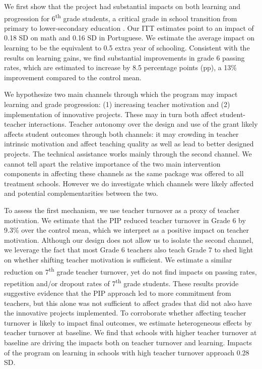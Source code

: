 \documentclass[11pt,a4paper]{article}
\begin{document}

We first show that the project had substantial impacts on both learning and progression for 6\textsuperscript{th} grade students, a critical grade in school transition from primary to lower-secondary education \citep{dos2017mais}. Our ITT estimates point to an impact of 0.18 SD on math and 0.16 SD in Portuguese. We estimate the average impact on learning to be the equivalent to 0.5 extra year of schooling. Consistent with the results on learning gains, we find substantial improvements in grade 6 passing rates, which are estimated to increase by 8.5 percentage points (pp), a 13\% improvement compared to the control mean.



We hypothesize two main channels through which the program may impact learning and grade progression: (1) increasing teacher motivation and (2) implementation of innovative projects. These may in turn both affect student-teacher interactions. Teacher autonomy over the design and use of the grant likely affects student outcomes through both channels: it may crowding in teacher intrinsic motivation and affect teaching quality as well as lead to better designed projects. The technical assistance works mainly through the second channel. We cannot tell apart the relative importance of the two main intervention components in affecting these channels as the same package was offered to all treatment schools. However we do investigate which channels were likely affected and potential complementarities between the two.  


To assess the first mechanism, we use teacher turnover as a proxy of teacher motivation. We estimate that the PIP reduced teacher turnover in Grade 6 by 9.3\% over the control mean, which we interpret as a positive impact on teacher motivation. Although our design does not allow us to isolate the second channel, we leverage the fact that most Grade 6 teachers also teach Grade 7 to shed light on whether shifting teacher motivation is sufficient. We estimate a similar reduction on 7\textsuperscript{th} grade teacher turnover, yet do not find impacts on passing rates, repetition and/or dropout rates of 7\textsuperscript{th} grade students. These results provide suggestive evidence that the PIP approach led to more commitment from teachers, but this alone was not sufficient to affect grades that did not also have the innovative projects implemented. To corroborate whether affecting teacher turnover is likely to impact final outcomes, we estimate heterogeneous effects by teacher turnover at baseline. We find that schools with higher teacher turnover at baseline are driving the impacts both on teacher turnover and learning. Impacts of the program on learning in schools with high teacher turnover approach 0.28 SD. 
\end{document}
